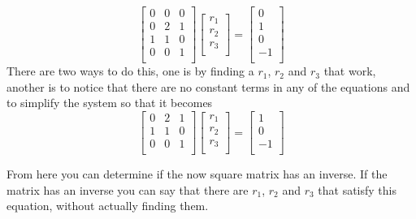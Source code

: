 {\[
\begin{bmatrix}
0& 0& 0\\
0& 2& 1\\
1& 1& 0\\
0& 0& 1\\
\end{bmatrix}
\begin{bmatrix}
r_1\\
r_2\\
r_3\\
\end{bmatrix}
= 
\begin{bmatrix}
0\\
1\\
0\\
-1\\
\end{bmatrix}
\]
There are two ways to do this, one is by finding a $r_1$, $r_2$ and $r_3$ that work, another is to notice that there are no constant terms in any of the equations and to simplify the system so that it becomes
\[
\begin{bmatrix}
0& 2& 1\\
1& 1& 0\\
0& 0& 1\\
\end{bmatrix}
\begin{bmatrix}
r_1\\
r_2\\
r_3\\
\end{bmatrix}
= 
\begin{bmatrix}
1\\
0\\
-1\\
\end{bmatrix}
\]

From here you can determine if the now square matrix has an inverse. If the matrix has an inverse you can say that there are $r_1$, $r_2$ and $r_3$ that satisfy this equation, without actually finding them.
} %

\newpage
